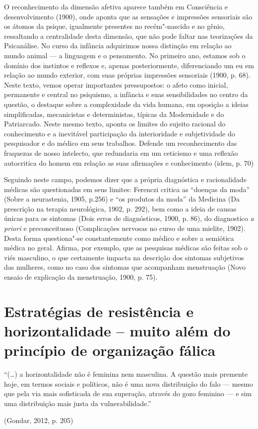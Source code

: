 O reconhecimento da dimensão afetiva aparece também em Consciência e
desenvolvimento (1900), onde aponta que as sensações e impressões
sensoriais são os átomos da psique, igualmente presentes no
recém"-nascido e no gênio, ressaltando a centralidade desta dimensão, que
não pode faltar nas teorizações da Psicanálise. No curso da infância
adquirimos nossa distinção em relação ao mundo animal --- a linguagem e o
pensamento. No primeiro ano, estamos sob o domínio dos instintos e
reflexos e, apenas posteriormente, diferenciando um eu em relação ao
mundo exterior, com suas próprias impressões sensoriais (1900, p. 68).
Neste texto, vemos operar importantes pressupostos: o afeto como
inicial, permanente e central no psiquismo, a infância e suas
sensibilidades no centro da questão, o destaque sobre a complexidade da
vida humana, em oposição a ideias simplificadas, mecanicistas e
deterministas, típicas da Modernidade e do Patriarcado. Neste mesmo
texto, aponta os limites do sujeito racional do conhecimento e a
inevitável participação da interioridade e subjetividade do pesquisador
e do médico em seus trabalhos. Defende um reconhecimento das fraquezas
de nosso intelecto, que redundaria em um ceticismo e uma reflexão
autocritica do homem em relação as suas afirmações e conhecimento (idem,
p. 70)

Seguindo neste campo, podemos dizer que a própria diagnóstica e
racionalidade médicas são questionadas em seus limites: Ferenczi critica
as ``doenças da moda'' (Sobre a neurastenia, 1905, p.256) e ``os
produtos da moda'' da Medicina (Da prescrição na terapia neurológica,
1902, p. 292), bem como a ideia de causas únicas para os sintomas (Dois
erros de diagnósticos, 1900, p. 86), do diagnostico \emph{a priori} e
preconceituoso (Complicações nervosas no curso de uma mielite, 1902).
Desta forma questiona"-se constantemente como médico e sobre a semiótica
médica no geral. Afirma, por exemplo, que as pesquisas médicas são
feitas sob o viés masculino, o que certamente impacta na descrição dos
sintomas subjetivos das mulheres, como no caso dos sintomas que
acompanham menstruação (Novo ensaio de explicação da menstruação, 1900,
p. 75).

\section{Estratégias de resistência e horizontalidade -- muito além do
princípio de organização fálica }

\epigraph{``(\ldots{}) a horizontalidade não é feminina nem masculina.
A questão mais premente hoje, em termos sociais e políticos,
não é uma nova distribuição do falo --- mesmo que pela
via mais sofisticada de sua superação, através do gozo feminino
--- e sim uma distribuição mais justa da vulnerabilidade.''}{(Gondar, 2012, p. 205)}

